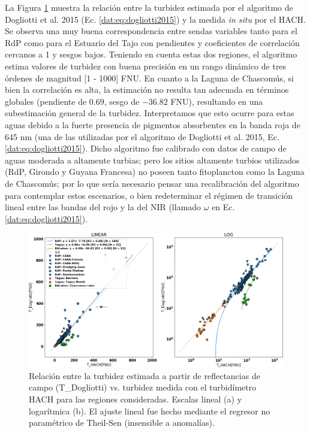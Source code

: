         La Figura \ref{dat:T_DogliottivsT_HACH} muestra la relación entre la turbidez estimada por el algoritmo de Dogliotti et al. 2015 (Ec. \ref{dat:eq:dogliotti2015}) y la medida \textit{in situ} por el HACH. Se observa una muy buena correspondencia entre sendas variables tanto para el RdP como para el Estuario del Tajo con pendientes y coeficientes de correlación cercanos a 1 y sesgos bajos. Teniendo en cuenta estas dos regiones, el algoritmo estima valores de turbidez con buena precisión en un rango dinámico de tres órdenes de magnitud [1 - 1000] FNU. En cuanto a la Laguna de Chascomús, si bien la correlación es alta, la estimación no resulta tan adecuada en términos globales (pendiente de $0.69$, sesgo de $-36.82$ FNU), resultando en una subestimación general de la turbidez. Interpretamos que esto ocurre para estas aguas debido a la fuerte presencia de pigmentos absorbentes en la banda roja de 645 nm (una de las utilizadas por el algoritmo de Dogliotti et al. 2015, Ec. \ref{dat:eq:dogliotti2015}). Dicho algoritmo fue calibrado con datos de campo de aguas moderada a altamente turbias; pero los sitios altamente turbios utilizados (RdP, Girondo y Guyana Francesa) no poseen tanto fitoplancton como la Laguna de Chascomús; por lo que sería necesario pensar una recalibración del algoritmo para contemplar estos escenarios, o bien redeterminar el régimen de transición lineal entre las bandas del rojo y la del NIR (llamado $\omega$ en Ec. \ref{dat:eq:dogliotti2015}).

        \begin{figure}
        \centering
        \includegraphics[width=\textwidth]{dat/figures/ScatterT_DogliottivsT_HACH.png}
        \caption[Relación entre la turbidez estimada a partir de reflectancias de agua de campo (T\_Dogliotti) vs. turbidez medida con el turbidímetro HACH.]{Relación entre la turbidez estimada a partir de reflectancias de campo (T\_Dogliotti) vs. turbidez medida con el turbidímetro HACH para las regiones consideradas. Escalas lineal (a) y logarítmica (b). El ajuste lineal fue hecho mediante el regresor no paramétrico de Theil-Sen (insensible a anomalías).}
        \label{dat:T_DogliottivsT_HACH}
        \end{figure}

